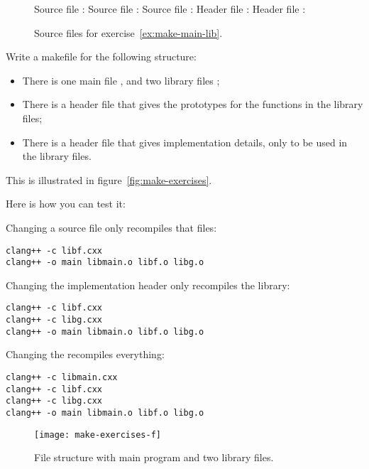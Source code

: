 \begin{figure}[t]
  \begin{multicols}{2}
    Source file :
    Source file :
    Source file :
    Header file :
    Header file :
  \end{multicols}
  \caption{Source files for exercise~\ref{ex:make-main-lib}.}
  \label{fig:make-files}
\end{figure}

\begin{exercise}
  \label{ex:make-main-lib}
  Write a makefile for the following structure:
  \begin{itemize}
  \item There is one main file , and two library files
     ;
  \item There is a header file  that gives the prototypes
    for the functions in the library files;
  \item There is a header file  that gives implementation
    details, only to be used in the library files.
  \end{itemize}
  This is illustrated in figure~\ref{fig:make-exercises}.

  Here is how you can test it:
  \begin{multicols}{2}
    \footnotesize
    Changing a source file only recompiles that files:
\begin{verbatim}
clang++ -c libf.cxx
clang++ -o main libmain.o libf.o libg.o
\end{verbatim}
Changing the implementation header only recompiles the library:
\begin{verbatim}
clang++ -c libf.cxx
clang++ -c libg.cxx
clang++ -o main libmain.o libf.o libg.o  
\end{verbatim}
Changing the  recompiles everything:
\begin{verbatim}
clang++ -c libmain.cxx
clang++ -c libf.cxx
clang++ -c libg.cxx
clang++ -o main libmain.o libf.o libg.o
\end{verbatim}
  \end{multicols}
\end{exercise}

\begin{figure}[ht]
  \texttt{[image: make-exercises-f]}
  \caption{File structure with main program and two library files.}
  \label{fig:make-exercises-f}
\end{figure}

